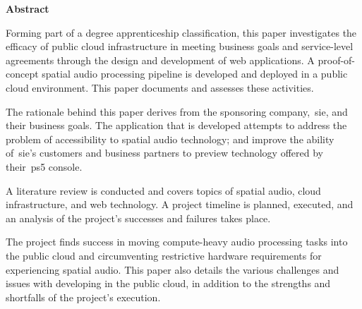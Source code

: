 \thispagestyle{plain}
\begin{center}
    \vspace{0.9cm}
    \textbf{Abstract}
\end{center}

Forming part of a degree apprenticeship classification, this paper investigates the efficacy of public cloud infrastructure in meeting business goals and service-level agreements through the design and development of web applications.
A proof-of-concept spatial audio processing pipeline is developed and deployed in a public cloud environment.
This paper documents and assesses these activities.

The rationale behind this paper derives from the sponsoring company,~\gls{sie}, and their business goals.
The application that is developed attempts to address the problem of accessibility to spatial audio technology;
and improve the ability of~\gls{sie}'s customers and business partners to preview technology offered by their~\gls{ps5} console.

A literature review is conducted and covers topics of spatial audio, cloud infrastructure, and web technology.
A project timeline is planned, executed, and an analysis of the project's successes and failures takes place.

The project finds success in moving compute-heavy audio processing tasks into the public cloud and circumventing restrictive hardware requirements for experiencing spatial audio.
This paper also details the various challenges and issues with developing in the public cloud, in addition to the strengths and shortfalls of the project's execution.
